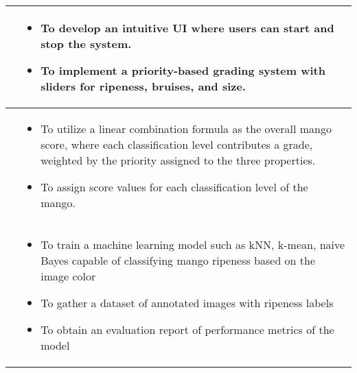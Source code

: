 \begin{table}[!htbp]
{\begin{tabular}{p{}|p{}}
			\Paste{SO3} & 
			\begin{minipage}{0.55\textwidth}
				\vspace{10pt}
				\begin{itemize}
					\item To develop an intuitive UI where users can start and stop the system.
					\item To implement a priority-based grading system with sliders for ripeness, bruises, and size.
				\end{itemize}
			\end{minipage} \\ \hline
			
			\Paste{SO4} & 
			\begin{minipage}{0.55\textwidth}
				\vspace{10pt}
				\begin{itemize}
					\item To utilize a linear combination formula as the overall mango score, where each classification level 
					contributes a grade, weighted by the priority assigned to the three properties.
					\item To assign score values for each classification level of the mango.
				\end{itemize}
			\end{minipage} \\ \hline
			
			
			\Paste{SO5} & 
			\begin{minipage}{0.55\textwidth}
				\vspace{10pt}
				\begin{itemize}
					\item To train a machine learning model such as kNN, k-mean, naive Bayes capable
					of classifying mango ripeness based on the image color
					\item To gather a dataset of annotated images with ripeness labels
					\item To obtain an evaluation report of performance metrics of the model
				\end{itemize}
			\end{minipage} \\ \hline
			
			
		\end{tabular}	
		
	}
\end{table}


